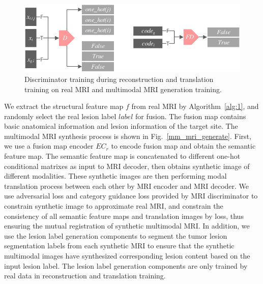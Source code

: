 \documentclass[letterpaper]{article} %
\begin{document}
\begin{figure}
	\centering
	\includegraphics[width=0.75\columnwidth]{figures/D}
	\caption{Discriminator training during reconstruction and translation training on real MRI and multimodal MRI generation training.}
	\label{train_D}
\end{figure}
We extract the structural feature map $f$ from real MRI by Algorithm~\ref{alg:1}, and randomly select the real lesion label $label$ for fusion. The fusion map contains basic anatomical information and lesion information of the target site. The multimodal MRI synthesis process is shown in Fig.~\ref{mm_mri_generate}. First, we use a fusion map encoder $EC_r$ to encode fusion map and obtain the semantic feature map. The semantic feature map is concatenated to different one-hot conditional matrixes as input to MRI decoder, then obtains synthetic image of different modalities. These synthetic images are then performing modal translation process between each other by MRI encoder and MRI decoder. We use adversarial loss and category guidance loss provided by MRI discriminator to constrain synthetic image to approximate real MRI, and constrain the consistency of all semantic feature maps and translation images by loss, thus ensuring the mutual registration of synthetic multimodal MRI. In addition, we use the lesion label generation components to segment the tumor lesion segmentation labels from each synthetic MRI to ensure that the synthetic multimodal images have synthesized corresponding lesion content based on the input lesion label. The lesion label generation components are only trained by real data in reconstruction and translation training. 
\end{document}
